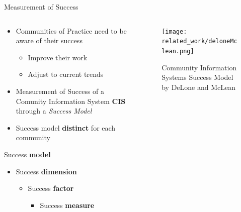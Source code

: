 \begin{frame}{Measurement of Success}
  \begin{columns}
    \begin{column}[]{0.3\textwidth}
      \begin{itemize}
        \item Communities of Practice need to be aware of their success
              \begin{itemize}
                \item Improve their work
                \item Adjust to current trends
              \end{itemize}
        \item Measurement of Success of a Comunity Information System \textbf{CIS} through a \emph{Success Model}
        \item Success model \textbf{distinct} for each community
      \end{itemize}

      Success \textbf{model} 
      \begin{itemize}
        \item Success \textbf{dimension}
        \begin{itemize}
          \item Success \textbf{factor}
          \begin{itemize}
            \item Success \textbf{measure}
          \end{itemize}
        \end{itemize}
      \end{itemize}

    \end{column}
    \begin{column}[]{0.7\textwidth}
      \begin{figure}
        \centering
        \texttt{[image: related\_work/deloneMclean.png]}
        \caption{Community Information Systems Success Model by DeLone and McLean \cite{DeMc92}}
      \end{figure}
    \end{column}
  \end{columns}
\end{frame}

